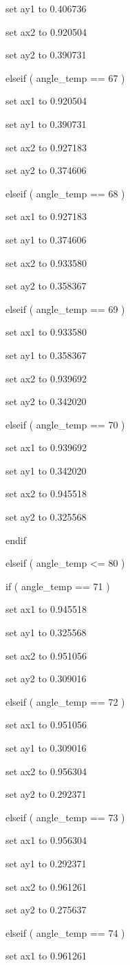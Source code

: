 \documentclass[
]{article}
\begin{document}
set ay1 to 0.406736

set ax2 to 0.920504

set ay2 to 0.390731

elseif ( angle\_temp == 67 )

set ax1 to 0.920504

set ay1 to 0.390731

set ax2 to 0.927183

set ay2 to 0.374606

elseif ( angle\_temp == 68 )

set ax1 to 0.927183

set ay1 to 0.374606

set ax2 to 0.933580

set ay2 to 0.358367

elseif ( angle\_temp == 69 )

set ax1 to 0.933580

set ay1 to 0.358367

set ax2 to 0.939692

set ay2 to 0.342020

elseif ( angle\_temp == 70 )

set ax1 to 0.939692

set ay1 to 0.342020

set ax2 to 0.945518

set ay2 to 0.325568

endif

elseif ( angle\_temp \textless= 80 )

if ( angle\_temp == 71 )

set ax1 to 0.945518

set ay1 to 0.325568

set ax2 to 0.951056

set ay2 to 0.309016

elseif ( angle\_temp == 72 )

set ax1 to 0.951056

set ay1 to 0.309016

set ax2 to 0.956304

set ay2 to 0.292371

elseif ( angle\_temp == 73 )

set ax1 to 0.956304

set ay1 to 0.292371

set ax2 to 0.961261

set ay2 to 0.275637

elseif ( angle\_temp == 74 )

set ax1 to 0.961261
\end{document}
